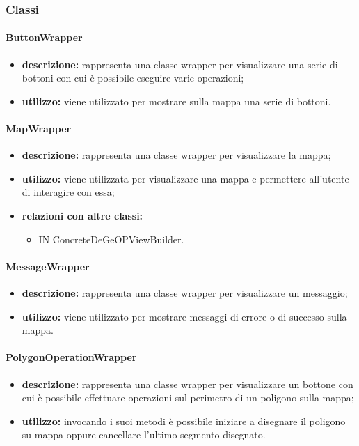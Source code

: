 \subsubsection{Classi}
\paragraph{ButtonWrapper}
\begin{itemize}
	\item \textbf{descrizione:} rappresenta una classe wrapper per visualizzare una serie di bottoni con cui è possibile eseguire varie operazioni;
	\item \textbf{utilizzo:} viene utilizzato per mostrare sulla mappa una serie di bottoni.
\end{itemize}
\paragraph{MapWrapper}
\begin{itemize}
	\item \textbf{descrizione:} rappresenta una classe wrapper per visualizzare la mappa;
	\item \textbf{utilizzo:} viene utilizzata per visualizzare una mappa e permettere all'utente di interagire con essa;
	\item \textbf{relazioni con altre classi:} 
	\begin{itemize}
		\item IN ConcreteDeGeOPViewBuilder.
	\end{itemize}
\end{itemize}
\paragraph{MessageWrapper}
\begin{itemize}
	\item \textbf{descrizione:} rappresenta una classe wrapper per visualizzare un messaggio;
	\item \textbf{utilizzo:} viene utilizzato per mostrare messaggi di errore o di successo sulla mappa.
\end{itemize}
\paragraph{PolygonOperationWrapper}
\begin{itemize}
	\item \textbf{descrizione:} rappresenta una classe wrapper per visualizzare un bottone con cui è possibile effettuare operazioni sul perimetro di un poligono sulla mappa;
	\item \textbf{utilizzo:} invocando i suoi metodi è possibile iniziare a disegnare il poligono su mappa oppure cancellare l'ultimo segmento disegnato.
\end{itemize}
\newpage

